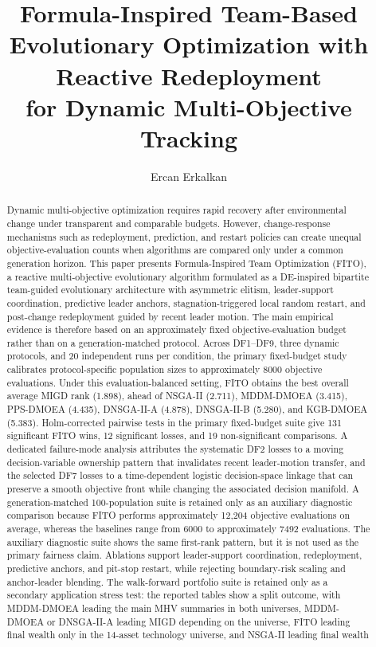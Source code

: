\documentclass[preprint,12pt]{elsarticle}
\begin{document}
\begin{frontmatter}

\title{Formula-Inspired Team-Based Evolutionary Optimization with Reactive Redeployment\\ for Dynamic Multi-Objective Tracking}

\author{Ercan Erkalkan}

\begin{abstract}
Dynamic multi-objective optimization requires rapid recovery after environmental change under transparent and comparable budgets. However, change-response mechanisms such as redeployment, prediction, and restart policies can create unequal objective-evaluation counts when algorithms are compared only under a common generation horizon. This paper presents Formula-Inspired Team Optimization (FITO), a reactive multi-objective evolutionary algorithm formulated as a DE-inspired bipartite team-guided evolutionary architecture with asymmetric elitism, leader-support coordination, predictive leader anchors, stagnation-triggered local random restart, and post-change redeployment guided by recent leader motion. The main empirical evidence is therefore based on an approximately fixed objective-evaluation budget rather than on a generation-matched protocol. Across DF1--DF9, three dynamic protocols, and 20 independent runs per condition, the primary fixed-budget study calibrates protocol-specific population sizes to approximately 8000 objective evaluations. Under this evaluation-balanced setting, FITO obtains the best overall average MIGD rank (1.898), ahead of NSGA-II (2.711), MDDM-DMOEA (3.415), PPS-DMOEA (4.435), DNSGA-II-A (4.878), DNSGA-II-B (5.280), and KGB-DMOEA (5.383). Holm-corrected pairwise tests in the primary fixed-budget suite give 131 significant FITO wins, 12 significant losses, and 19 non-significant comparisons. A dedicated failure-mode analysis attributes the systematic DF2 losses to a moving decision-variable ownership pattern that invalidates recent leader-motion transfer, and the selected DF7 losses to a time-dependent logistic decision-space linkage that can preserve a smooth objective front while changing the associated decision manifold. A generation-matched 100-population suite is retained only as an auxiliary diagnostic comparison because FITO performs approximately 12,204 objective evaluations on average, whereas the baselines range from 6000 to approximately 7492 evaluations. The auxiliary diagnostic suite shows the same first-rank pattern, but it is not used as the primary fairness claim. Ablations support leader-support coordination, redeployment, predictive anchors, and pit-stop restart, while rejecting boundary-risk scaling and anchor-leader blending. The walk-forward portfolio suite is retained only as a secondary application stress test: the reported tables show a split outcome, with MDDM-DMOEA leading the main MHV summaries in both universes, MDDM-DMOEA or DNSGA-II-A leading MIGD depending on the universe, FITO leading final wealth only in the 14-asset technology universe, and NSGA-II leading final wealth 
\end{abstract}
\end{frontmatter}
\end{document}
